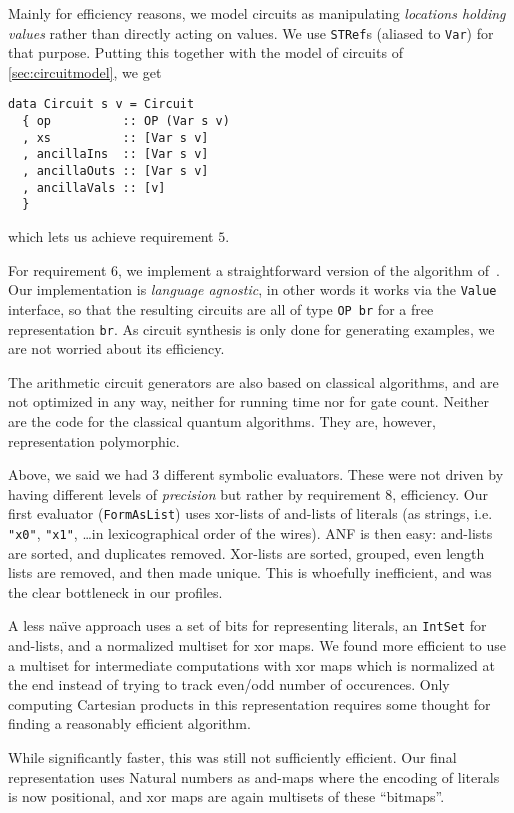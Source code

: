 \documentclass[sigplan]{acmart}
\begin{document}
\noindent Mainly for efficiency reasons, we model circuits as manipulating
\emph{locations holding values} rather than directly acting on values. We
use \texttt{STRef}s (aliased to \texttt{Var}) for that purpose. Putting this
together with the model of circuits of \ref{sec:circuitmodel}, we get
\begin{verbatim}
data Circuit s v = Circuit
  { op          :: OP (Var s v)
  , xs          :: [Var s v]
  , ancillaIns  :: [Var s v]
  , ancillaOuts :: [Var s v]  
  , ancillaVals :: [v]
  }
\end{verbatim}
\noindent which lets us achieve requirement $5$.

For requirement $6$, we implement a straightforward version of 
the algorithm of~\cite{SoekenEtAl2016}. Our implementation is
\emph{language agnostic}, in other words it works via the \texttt{Value}
interface, so that the resulting circuits are all of type \texttt{OP br}
for a free representation \texttt{br}. As circuit synthesis is only
done for generating examples, we are not worried about its efficiency.

The arithmetic circuit generators are also based on classical algorithms, and are
not optimized in any way, neither for running time nor for gate count. Neither are
the code for the classical quantum algorithms. They are, however, representation
polymorphic.

Above, we said we had $3$ different symbolic evaluators. These were not driven
by having different levels of \emph{precision} but rather by requirement $8$,
efficiency. Our first evaluator (\texttt{FormAsList}) uses xor-lists of
and-lists of literals (as strings, i.e.
\texttt{"x0"}, \texttt{"x1"}, \ldots in lexicographical order of the wires). ANF 
is then easy: and-lists are sorted, and duplicates removed. Xor-lists are sorted,
grouped, even length lists are removed, and then made unique. This is whoefully
inefficient, and was the clear bottleneck in our profiles.

A less na\"{\i}ve approach uses a set of bits for representing literals, an
\texttt{IntSet} for and-lists, and a normalized multiset for xor maps. We found
more efficient to use a multiset for intermediate computations with xor maps
which is normalized at the end instead of trying to track even/odd number of
occurences. Only computing Cartesian products in this representation requires
some thought for finding a reasonably efficient algorithm.

While significantly faster, this was still not sufficiently efficient. Our final
representation uses Natural numbers as and-maps where the encoding of literals is
now positional, and xor maps are again multisets of these ``bitmaps''.
\end{document}
